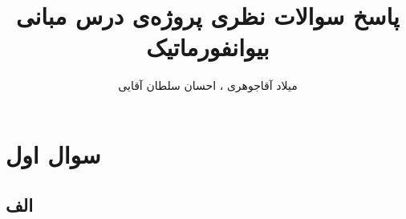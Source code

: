 \documentclass[11pt]{article}
\title{پاسخ سوالات نظری پروژه‌ی درس مبانی بیو‌انفورماتیک}
\author{میلاد آقاجوهری ، احسان سلطان آقایی}
\begin{document}
\maketitle
\section{سوال اول}
\subsection{الف}
\end{document}
